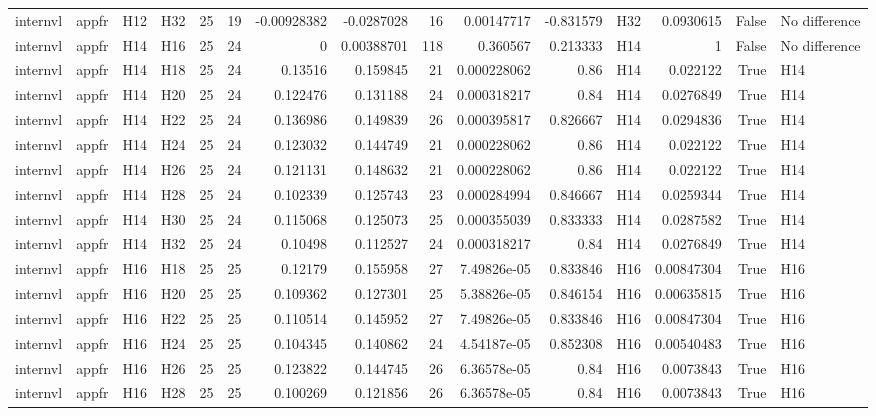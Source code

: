 \begin{longtable}{llllrrrrrrrlrrl}
internvl & appfr & H12 & H32 & 25 & 19 & -0.00928382 & -0.0287028 & 16 & 0.00147717 & -0.831579 & H32 & 0.0930615 & False & No difference \\
internvl & appfr & H14 & H16 & 25 & 24 & 0 & 0.00388701 & 118 & 0.360567 & 0.213333 & H14 & 1 & False & No difference \\
internvl & appfr & H14 & H18 & 25 & 24 & 0.13516 & 0.159845 & 21 & 0.000228062 & 0.86 & H14 & 0.022122 & True & H14 \\
internvl & appfr & H14 & H20 & 25 & 24 & 0.122476 & 0.131188 & 24 & 0.000318217 & 0.84 & H14 & 0.0276849 & True & H14 \\
internvl & appfr & H14 & H22 & 25 & 24 & 0.136986 & 0.149839 & 26 & 0.000395817 & 0.826667 & H14 & 0.0294836 & True & H14 \\
internvl & appfr & H14 & H24 & 25 & 24 & 0.123032 & 0.144749 & 21 & 0.000228062 & 0.86 & H14 & 0.022122 & True & H14 \\
internvl & appfr & H14 & H26 & 25 & 24 & 0.121131 & 0.148632 & 21 & 0.000228062 & 0.86 & H14 & 0.022122 & True & H14 \\
internvl & appfr & H14 & H28 & 25 & 24 & 0.102339 & 0.125743 & 23 & 0.000284994 & 0.846667 & H14 & 0.0259344 & True & H14 \\
internvl & appfr & H14 & H30 & 25 & 24 & 0.115068 & 0.125073 & 25 & 0.000355039 & 0.833333 & H14 & 0.0287582 & True & H14 \\
internvl & appfr & H14 & H32 & 25 & 24 & 0.10498 & 0.112527 & 24 & 0.000318217 & 0.84 & H14 & 0.0276849 & True & H14 \\
internvl & appfr & H16 & H18 & 25 & 25 & 0.12179 & 0.155958 & 27 & 7.49826e-05 & 0.833846 & H16 & 0.00847304 & True & H16 \\
internvl & appfr & H16 & H20 & 25 & 25 & 0.109362 & 0.127301 & 25 & 5.38826e-05 & 0.846154 & H16 & 0.00635815 & True & H16 \\
internvl & appfr & H16 & H22 & 25 & 25 & 0.110514 & 0.145952 & 27 & 7.49826e-05 & 0.833846 & H16 & 0.00847304 & True & H16 \\
internvl & appfr & H16 & H24 & 25 & 25 & 0.104345 & 0.140862 & 24 & 4.54187e-05 & 0.852308 & H16 & 0.00540483 & True & H16 \\
internvl & appfr & H16 & H26 & 25 & 25 & 0.123822 & 0.144745 & 26 & 6.36578e-05 & 0.84 & H16 & 0.0073843 & True & H16 \\
internvl & appfr & H16 & H28 & 25 & 25 & 0.100269 & 0.121856 & 26 & 6.36578e-05 & 0.84 & H16 & 0.0073843 & True & H16 \\

\end{longtable}
